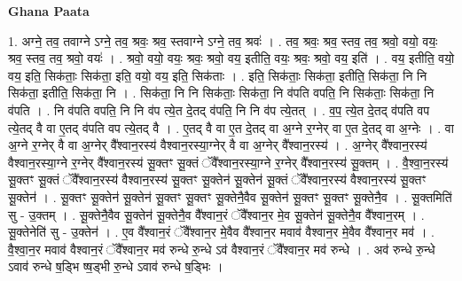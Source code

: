 \documentclass[17pt]{extarticle}
\begin{document}
\textbf{Ghana Paata } \newline

1. अग्ने॒ तव॒ तवाग्ने ऽग्ने॒ तव॒ श्रवः॒ श्रव॒ स्तवाग्ने ऽग्ने॒ तव॒ श्रवः॑ । . तव॒ श्रवः॒ श्रव॒ स्तव॒ तव॒ श्रवो॒ वयो॒ वयः॒ श्रव॒ स्तव॒ तव॒ श्रवो॒ वयः॑ । . श्रवो॒ वयो॒ वयः॒ श्रवः॒ श्रवो॒ वय॒ इतीति॒ वयः॒ श्रवः॒ श्रवो॒ वय॒ इति॑ । . वय॒ इतीति॒ वयो॒ वय॒ इति॒ सिक॑ताः॒ सिक॑ता॒ इति॒ वयो॒ वय॒ इति॒ सिक॑ताः । . इति॒ सिक॑ताः॒ सिक॑ता॒ इतीति॒ सिक॑ता॒ नि नि सिक॑ता॒ इतीति॒ सिक॑ता॒ नि । . सिक॑ता॒ नि नि सिक॑ताः॒ सिक॑ता॒ नि व॑पति वपति॒ नि सिक॑ताः॒ सिक॑ता॒ नि व॑पति । . नि व॑पति वपति॒ नि नि व॑प त्ये॒त दे॒तद् व॑पति॒ नि नि व॑प त्ये॒तत् । . व॒प॒ त्ये॒त दे॒तद् व॑पति वप त्ये॒तद् वै वा ए॒तद् व॑पति वप त्ये॒तद् वै । . ए॒तद् वै वा ए॒त दे॒तद् वा अ॒ग्ने र॒ग्नेर् वा ए॒त दे॒तद् वा अ॒ग्नेः । . वा अ॒ग्ने र॒ग्नेर् वै वा अ॒ग्नेर् वै᳚श्वान॒रस्य॑ वैश्वान॒रस्या॒ग्नेर् वै वा अ॒ग्नेर् वै᳚श्वान॒रस्य॑ । . अ॒ग्नेर् वै᳚श्वान॒रस्य॑ वैश्वान॒रस्या॒ग्ने र॒ग्नेर् वै᳚श्वान॒रस्य॑ सू॒क्तꣳ सू॒क्तं ॅवै᳚श्वान॒रस्या॒ग्ने र॒ग्नेर् वै᳚श्वान॒रस्य॑ सू॒क्तम् । . वै॒श्वा॒न॒रस्य॑ सू॒क्तꣳ सू॒क्तं ॅवै᳚श्वान॒रस्य॑ वैश्वान॒रस्य॑ सू॒क्तꣳ सू॒क्तेन॑ सू॒क्तेन॑ सू॒क्तं ॅवै᳚श्वान॒रस्य॑ वैश्वान॒रस्य॑ सू॒क्तꣳ सू॒क्तेन॑ । . सू॒क्तꣳ सू॒क्तेन॑ सू॒क्तेन॑ सू॒क्तꣳ सू॒क्तꣳ सू॒क्तेनै॒वैव सू॒क्तेन॑ सू॒क्तꣳ सू॒क्तꣳ सू॒क्तेनै॒व । . सू॒क्तमिति॑ सु - उ॒क्तम् । . सू॒क्तेनै॒वैव सू॒क्तेन॑ सू॒क्तेनै॒व वै᳚श्वान॒रं ॅवै᳚श्वान॒र मे॒व सू॒क्तेन॑ सू॒क्तेनै॒व वै᳚श्वान॒रम् । . सू॒क्तेनेति॑ सु - उ॒क्तेन॑ । . ए॒व वै᳚श्वान॒रं ॅवै᳚श्वान॒र मे॒वैव वै᳚श्वान॒र मवाव॑ वैश्वान॒र मे॒वैव वै᳚श्वान॒र मव॑ । . वै॒श्वा॒न॒र मवाव॑ वैश्वान॒रं ॅवै᳚श्वान॒र मव॑ रुन्धे रु॒न्धे ऽव॑ वैश्वान॒रं ॅवै᳚श्वान॒र मव॑ रुन्धे । . अव॑ रुन्धे रु॒न्धे ऽवाव॑ रुन्धे ष॒ड्भि ष्ष॒ड्भी रु॒न्धे ऽवाव॑ रुन्धे ष॒ड्भिः । \newline
\end{document}
